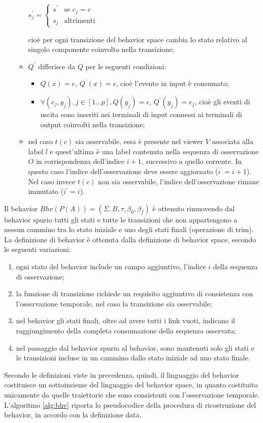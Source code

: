\begin{defn}
\begin{enumerate}
\begin{itemize}
\begin{center}
$s^\prime_j = \begin{cases} s^\prime & \mbox{se }c_j = c\\ s_j & \mbox{altrimenti} \end{cases}$
\end{center}
cioè per ogni transizione del behavior space cambia lo stato relativo al singolo componente coinvolto nella transizione;
\item $Q^\prime$ differisce da $Q$ per le seguenti condizioni:
\begin{itemize}
\item $Q(x) = e$, $Q^\prime(x) = \epsilon$, cioè l'evento in input è consumato;
\item $\forall(e_j,y_j), j \in [1 \ldots p], Q(y_j) = \epsilon$, $Q^\prime(y_j) = e_j$, cioè gli eventi di uscita sono inseriti nei terminali di input connessi ai terminali di output coinvolti nella transizione; 
\end{itemize}
\item nel caso $t(c)$ sia osservabile, essa è presente nel viewer $V$ associata alla label $l$ e quest'ultima è una label contenuta nella sequenza di osservazione $O$ in corrispondenza dell'indice $i+1$, successivo a quello corrente. In questo caso l'indice dell'osservazione deve essere aggiornato ($i^\prime = i+1$). Nel caso invece $t(c)$ non sia osservabile, l'indice dell'osservazione rimane immutato ($i^\prime = i$).
\end{itemize}
\end{enumerate}

\end{defn}
Il behavior $Bhv(P(A)) = (\Sigma,B,\tau,\beta_0,\beta_f)$ è ottenuto rimuovendo dal behavior spurio tutti gli stati e tutte le transizioni che non appartengono a nessun cammino tra lo stato iniziale e uno degli stati finali (operazione di trim).
La definizione di behavior è ottenuta dalla definizione di behavior space, secondo le seguenti variazioni:
\begin{enumerate}
\item ogni stato del behavior include un campo aggiuntivo, l'indice $i$ della sequenza di osservazione;
\item la funzione di transizione richiede un requisito aggiuntivo di consistenza con l'osservazione temporale, nel caso la transizione sia osservabile;
\item nel behavior gli stati finali, oltre ad avere tutti i link vuoti, indicano il raggiungimento della completa consumazione della sequenza osservata;
\item nel passaggio dal behavior spurio al behavior, sono mantenuti solo gli stati e le transizioni incluse in un cammino dallo stato iniziale ad uno stato finale.
\end{enumerate}
Secondo le definizioni viste in precedenza, quindi, il linguaggio del behavior costituisce un sottoinsieme del linguaggio del behavior space, in quanto costituito unicamente da quelle traiettorie che sono consistenti con l'osservazione temporale.
L'algoritmo \ref{alg:bhv} riporta lo pseudocodice della procedura di ricostruzione del behavior, in accordo con la definizione data.

